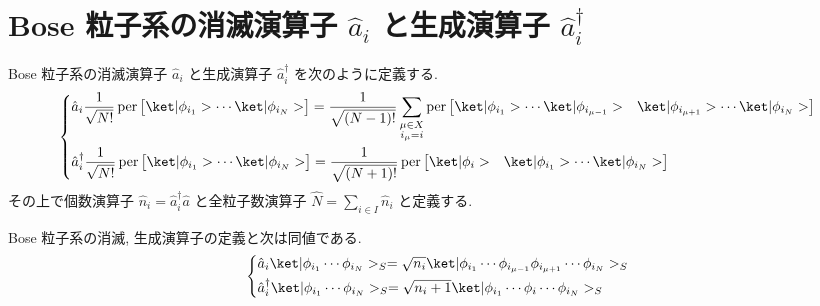\documentclass[uplatex,dvipdfmx,a4paper,11pt]{jlreq}
\DeclareMathOperator{\per}{per}
\numberwithin{equation}{section}
\theoremstyle{definition}
\begin{document}
\section{Bose 粒子系の消滅演算子 $\hat{a}_i$ と生成演算子 $\hat{a}_i^\dagger$}
\begin{definition}
  Bose 粒子系の消滅演算子 $\hat{a}_i$ と生成演算子 $\hat{a}_i^\dagger$ を次のように定義する.
  \begin{align}
    \begin{dcases}
      \hat{a}_i\frac{1}{\sqrt{N!}}\per\begin{bmatrix}\ket|\phi_{i_1}> \cdots \ket|\phi_{i_N}>\end{bmatrix} = \frac{1}{\sqrt{(N-1)!}}\sum_{\substack{\mu\in X \\ i_\mu = i}}\per\begin{bmatrix}\ket|\phi_{i_1}> \cdots \ket|\phi_{i_{\mu - 1}}> & \ket|\phi_{i_{\mu + 1}}> \cdots \ket|\phi_{i_N}>\end{bmatrix} \\
      \hat{a}_i^\dagger\frac{1}{\sqrt{N!}}\per\begin{bmatrix}\ket|\phi_{i_1}> \cdots \ket|\phi_{i_N}>\end{bmatrix} = \frac{1}{\sqrt{(N+1)!}}\per\begin{bmatrix}\ket|\phi_{i}> & \ket|\phi_{i_1}> \cdots \ket|\phi_{i_N}>\end{bmatrix}
    \end{dcases}
  \end{align}
  その上で個数演算子 $\hat{n}_i = \hat{a}_i^\dagger\hat{a}$ と全粒子数演算子 $\hat{N} = \sum_{i\in I}\hat{n}_i$ と定義する.
\end{definition}
\begin{theorem}[Q21-35]
  Bose 粒子系の消滅, 生成演算子の定義と次は同値である.
  \begin{align}
    \begin{dcases}
      \hat{a}_i\ket|\phi_{i_1}\cdots\phi_{i_N}>_S = \sqrt{n_i}\ket|\phi_{i_1}\cdots\phi_{i_{\mu - 1}}\phi_{i_{\mu + 1}}\cdots\phi_{i_N}>_S \\
      \hat{a}_i^\dagger\ket|\phi_{i_1}\cdots\phi_{i_N}>_S = \sqrt{n_i+1}\ket|\phi_{i_1}\cdots\phi_{i}\cdots\phi_{i_N}>_S
    \end{dcases}
  \end{align}
  \label{Bose creation and annihilation 1}
\end{theorem}
\end{document}
